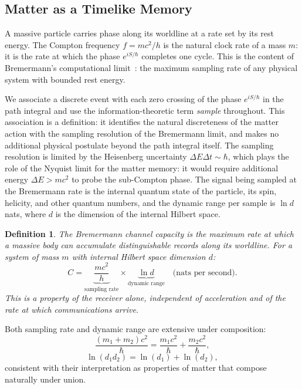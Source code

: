 \documentclass[12pt,a4paper]{article}
\newtheorem{definition}{Definition}[section]
\begin{document}
\subsection{Matter as a Timelike Memory}
\label{sec:channel}

A massive particle carries phase along its worldline 
at a rate set by its rest energy. The Compton frequency 
$f = mc^2/h$ is the natural clock rate of a mass $m$: 
it is the rate at which the phase $e^{iS/\hbar}$ 
completes one cycle. This is the content of 
Bremermann's computational 
limit~\cite{bremermann1962optimization}: the maximum 
sampling rate of any physical system with bounded rest energy.

We associate a discrete event with each zero crossing 
of the phase $e^{iS/\hbar}$ in the path integral and 
use the information-theoretic term \emph{sample} 
throughout. This association is a definition: it 
identifies the natural discreteness of the matter 
action with the sampling resolution of the Bremermann 
limit, and makes no additional physical postulate 
beyond the path integral itself.
The sampling resolution is limited by the 
Heisenberg uncertainty $\Delta E \Delta t \sim \hbar$, 
which plays the role of the Nyquist limit for the 
matter memory: it would 
require additional energy $\Delta E > mc^2$ to probe 
the sub-Compton phase. The signal being sampled at 
the Bremermann rate is the internal quantum state of 
the particle, its spin, helicity, and other quantum 
numbers, and the dynamic range per sample is 
$\ln d$ nats, where $d$ is the dimension of the 
internal Hilbert space.

\begin{definition}
The Bremermann channel capacity is the maximum rate 
at which a massive body can accumulate distinguishable 
records along its worldline. For a system of mass $m$ 
with internal Hilbert space dimension $d$:
\begin{equation}
    C = \underbrace{\frac{mc^2}{h}}_{\text{sampling rate}} 
        \times 
        \underbrace{\ln d}_{\text{dynamic range}}
        \quad \text{(nats per second).}
    \label{eq:channel_capacity}
\end{equation}
This is a property of the receiver alone, independent 
of acceleration and of the rate at which communications 
arrive.
\end{definition}

Both sampling rate and dynamic range are extensive 
under composition:
\begin{equation}
    \frac{(m_1+m_2)c^2}{\hbar} 
    = \frac{m_1 c^2}{\hbar} + \frac{m_2 c^2}{\hbar},
\end{equation}
\begin{equation}
    \ln(d_1 d_2) 
    = \ln(d_1) + \ln(d_2),
\end{equation}
consistent with their interpretation as properties of 
matter that compose naturally under union.
\end{document}
